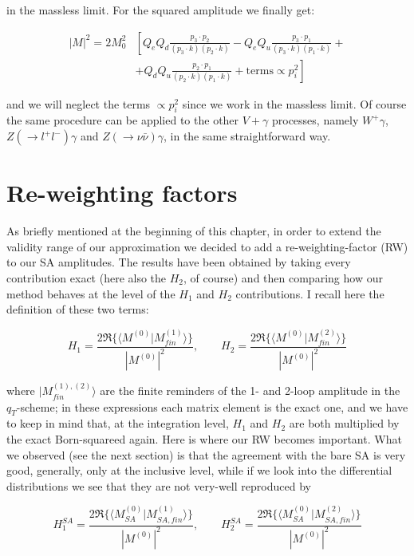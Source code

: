 \documentclass{report}
\begin{document}
in the massless limit. For the squared amplitude we finally get:

\begin{align}
    \left|M\right|^2 = 2M_0^2&\left[Q_eQ_d\frac{p_3\cdot p_2}{\left(p_3\cdot k\right)\left(p_2\cdot k\right)} - Q_eQ_u\frac{p_3\cdot p_1}{\left(p_3\cdot k\right)\left(p_1\cdot k\right)} + \right.\\
    &+ \left.Q_dQ_u\frac{p_2\cdot p_1}{\left(p_2\cdot k\right)\left(p_1\cdot k\right)} + \text{terms} \propto p_i^2\right]
\end{align}

and we will neglect the terms $\propto p_i^2$ since we work in the massless limit. Of course the same procedure can be applied to the other $V+\gamma$ processes, namely $W^+\gamma$, $Z(\to l^+l^-)\gamma$ and $Z(\to \nu\bar{\nu})\gamma$, in the same straightforward way.

\section{Re-weighting factors}
As briefly mentioned at the beginning of this chapter, in order to extend the validity range of our approximation we decided to add a re-weighting-factor (RW) to our SA amplitudes. The results have been obtained by taking every contribution exact (here also the $H_2$, of course)
and then comparing how our method behaves at the level of the $H_1$ and $H_2$ contributions. I recall here the definition of these two terms:

\begin{equation}
    H_1 = \frac{2\Re\{\langle M^{(0)}|M_{fin}^{(1)}\rangle\}}{\left|M^{(0)}\right|^2}, \qquad H_2 = \frac{2\Re\{\langle M^{(0)}|M_{fin}^{(2)}\rangle\}}{\left|M^{(0)}\right|^2}
\end{equation}

where $|M_{fin}^{(1), (2)}\rangle$ are the finite reminders of the 1- and 2-loop amplitude in the $q_T$-scheme; in these expressions each matrix element is the exact one, and we have to keep in mind that, at the integration level, $H_1$ and $H_2$ are both multiplied by the exact Born-squareed again.
Here is where our RW becomes important. What we observed (see the next section) is that the agreement with the bare SA is very good, generally, only at the inclusive level, while if we look into the differential distributions we see that they are not very-well reproduced by

\begin{equation}\label{basic SA}
    H_1^{SA} = \frac{2\Re\{\langle M_{SA}^{(0)}|M_{SA, fin}^{(1)}\rangle\}}{\left|M^{(0)}\right|^2}, \qquad H_2^{SA} = \frac{2\Re\{\langle M_{SA}^{(0)}|M_{SA, fin}^{(2)}\rangle\}}{\left|M^{(0)}\right|^2}
\end{equation}
\end{document}
